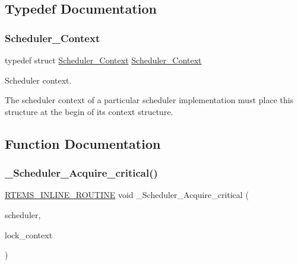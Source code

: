 \subsection{Typedef Documentation}
\mbox{\label{group__RTEMSScoreScheduler_ga812fbe4a2e25d974a05d8d457cc62698}} 
\subsubsection{\texorpdfstring{Scheduler\_Context}{Scheduler\_Context}}
{\footnotesize\ttfamily typedef struct \mbox{\hyperlink{structScheduler__Context}{Scheduler\+\_\+\+Context}}  \mbox{\hyperlink{structScheduler__Context}{Scheduler\+\_\+\+Context}}}



Scheduler context. 

The scheduler context of a particular scheduler implementation must place this structure at the begin of its context structure. 

\subsection{Function Documentation}
\mbox{\label{group__RTEMSScoreScheduler_ga9e6cf07526560aa067d7bcb92a7aa964}} 
\subsubsection{\texorpdfstring{\_Scheduler\_Acquire\_critical()}{\_Scheduler\_Acquire\_critical()}}
{\footnotesize\ttfamily \mbox{\hyperlink{group__RTEMSScoreBaseDefs_gac216239df231d5dbd15e3520b0b9313f}{R\+T\+E\+M\+S\+\_\+\+I\+N\+L\+I\+N\+E\+\_\+\+R\+O\+U\+T\+I\+NE}} void \+\_\+\+Scheduler\+\_\+\+Acquire\+\_\+critical (\begin{DoxyParamCaption}\item[{const \mbox{\hyperlink{struct__Scheduler__Control}{Scheduler\+\_\+\+Control}} $\ast$}]{scheduler,  }\item[{\mbox{\hyperlink{structISR__lock__Context}{I\+S\+R\+\_\+lock\+\_\+\+Context}} $\ast$}]{lock\+\_\+context }\end{DoxyParamCaption})}




